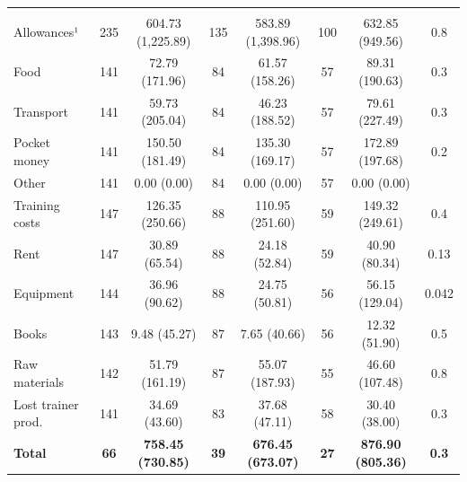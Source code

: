 \documentclass[
  a4paper, twoside, 12pt]{book}
\begin{document}
\begin{table}[H]
{\begin{threeparttable}
\begin{tabular}[t]{lccccccc}
\addlinespace[0.3em]
\multicolumn{8}{l}{\textbf{Costs}}\\
\hspace{1em}Allowances¹ & 235 & 604.73 (1,225.89) & 135 & 583.89 (1,398.96) & 100 & 632.85 (949.56) & 0.8\\
\hspace{1em}\hspace{1em}Food & 141 & 72.79 (171.96) & 84 & 61.57 (158.26) & 57 & 89.31 (190.63) & 0.3\\
\hspace{1em}\hspace{1em}Transport & 141 & 59.73 (205.04) & 84 & 46.23 (188.52) & 57 & 79.61 (227.49) & 0.3\\
\hspace{1em}\hspace{1em}Pocket money & 141 & 150.50 (181.49) & 84 & 135.30 (169.17) & 57 & 172.89 (197.68) & 0.2\\
\hspace{1em}\hspace{1em}Other & 141 & 0.00 (0.00) & 84 & 0.00 (0.00) & 57 & 0.00 (0.00) & \\
\hspace{1em}Training costs & 147 & 126.35 (250.66) & 88 & 110.95 (251.60) & 59 & 149.32 (249.61) & 0.4\\
\hspace{1em}\hspace{1em}Rent & 147 & 30.89 (65.54) & 88 & 24.18 (52.84) & 59 & 40.90 (80.34) & 0.13\\
\hspace{1em}\hspace{1em}Equipment & 144 & 36.96 (90.62) & 88 & 24.75 (50.81) & 56 & 56.15 (129.04) & 0.042\\
\hspace{1em}\hspace{1em}Books & 143 & 9.48 (45.27) & 87 & 7.65 (40.66) & 56 & 12.32 (51.90) & 0.5\\
\hspace{1em}\hspace{1em}Raw materials & 142 & 51.79 (161.19) & 87 & 55.07 (187.93) & 55 & 46.60 (107.48) & 0.8\\
\hspace{1em}Lost trainer prod. & 141 & 34.69 (43.60) & 83 & 37.68 (47.11) & 58 & 30.40 (38.00) & 0.3\\
\textbf{\hspace{1em}Total} & \textbf{66} & \textbf{758.45 (730.85)} & \textbf{39} & \textbf{676.45 (673.07)} & \textbf{27} & \textbf{876.90 (805.36)} & \textbf{0.3}\\

\end{tabular}
\end{threeparttable}}
\end{table}
\end{document}
